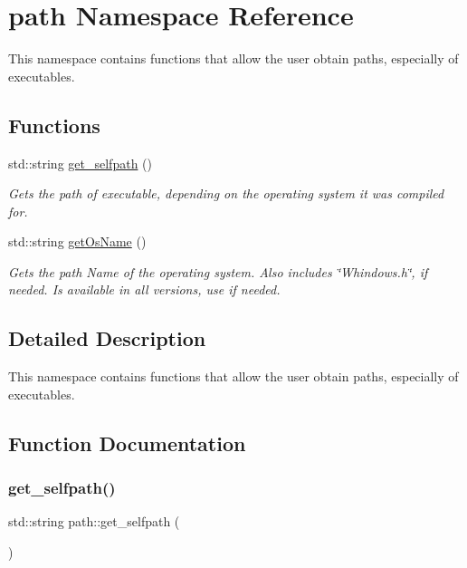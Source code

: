 \hypertarget{namespacepath}{}\section{path Namespace Reference}
\label{namespacepath}


This namespace contains functions that allow the user obtain paths, especially of executables.  


\subsection*{Functions}
\begin{DoxyCompactItemize}
\item 
std\+::string \hyperlink{namespacepath_a85795d606938290fd2f88b8fb2274b7d}{get\+\_\+selfpath} ()
\begin{DoxyCompactList}\small\item\em Gets the path of executable, depending on the operating system it was compiled for. \end{DoxyCompactList}\item 
std\+::string \hyperlink{namespacepath_a14ce44304deb85153eb99ce47dec74f5}{get\+Os\+Name} ()
\begin{DoxyCompactList}\small\item\em Gets the path Name of the operating system. Also includes \char`\"{}\+Whindows.\+h\char`\"{}, if needed. Is available in all versions, use if needed. \end{DoxyCompactList}\end{DoxyCompactItemize}


\subsection{Detailed Description}
This namespace contains functions that allow the user obtain paths, especially of executables. 

\subsection{Function Documentation}
\mbox{\label{namespacepath_a85795d606938290fd2f88b8fb2274b7d}} 
\subsubsection{\texorpdfstring{get\+\_\+selfpath()}{get\_selfpath()}}
{\footnotesize\ttfamily std\+::string path\+::get\+\_\+selfpath (\begin{DoxyParamCaption}{ }\end{DoxyParamCaption})}



